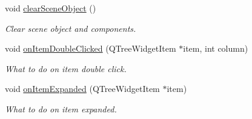 \begin{Indent}
\begin{DoxyCompactItemize}
\mbox{\label{classrev_1_1_view_1_1_component_tree_widget_a84aa7fc228da27a32168a0ea20509c91}} 
void \mbox{\hyperlink{classrev_1_1_view_1_1_component_tree_widget_a84aa7fc228da27a32168a0ea20509c91}{clear\+Scene\+Object}} ()
\begin{DoxyCompactList}\small\item\em Clear scene object and components. \end{DoxyCompactList}\item 
\mbox{\label{classrev_1_1_view_1_1_component_tree_widget_a7a77b17b568b5bb4f5581c2fa8763ea4}} 
void \mbox{\hyperlink{classrev_1_1_view_1_1_component_tree_widget_a7a77b17b568b5bb4f5581c2fa8763ea4}{on\+Item\+Double\+Clicked}} (Q\+Tree\+Widget\+Item $\ast$item, int column)
\begin{DoxyCompactList}\small\item\em What to do on item double click. \end{DoxyCompactList}\item 
\mbox{\label{classrev_1_1_view_1_1_component_tree_widget_a638a0dd8f360ae6cc85bfd975e241a19}} 
void \mbox{\hyperlink{classrev_1_1_view_1_1_component_tree_widget_a638a0dd8f360ae6cc85bfd975e241a19}{on\+Item\+Expanded}} (Q\+Tree\+Widget\+Item $\ast$item)
\begin{DoxyCompactList}\small\item\em What to do on item expanded. \end{DoxyCompactList}\end{DoxyCompactItemize}
\end{Indent}

